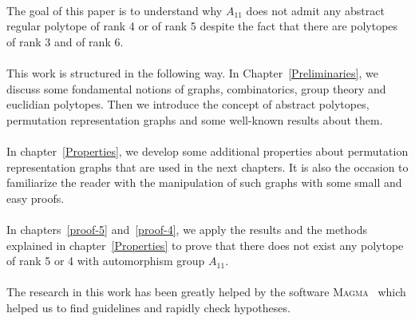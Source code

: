\paragraph{}
The goal of this paper is to understand why $A_{11}$ does not admit any abstract regular polytope of rank 4 or of rank 5 despite the fact that there are polytopes of rank 3 and of rank 6.

\paragraph{}
This work is structured in the following way. In Chapter~\ref{Preliminaries}, we discuss some fondamental notions of graphs, combinatorics, group theory and euclidian polytopes. Then we introduce the concept of abstract polytopes, permutation representation graphs and some well-known results about them.

\paragraph{}
In chapter~\ref{Properties}, we develop some additional properties about permutation representation graphs that are used in the next chapters. It is also the occasion to familiarize the reader with the manipulation of such graphs with some small and easy proofs.

\paragraph{}
In chapters~\ref{proof-5} and~\ref{proof-4}, we apply the results and the methods explained in chapter~\ref{Properties} to prove that there does not exist any polytope of rank 5 or 4 with automorphism group $A_{11}$.

\paragraph{}
The research in this work has been greatly helped by the software \textsc{Magma}~\cite{magma} which helped us to find guidelines and rapidly check hypotheses.
